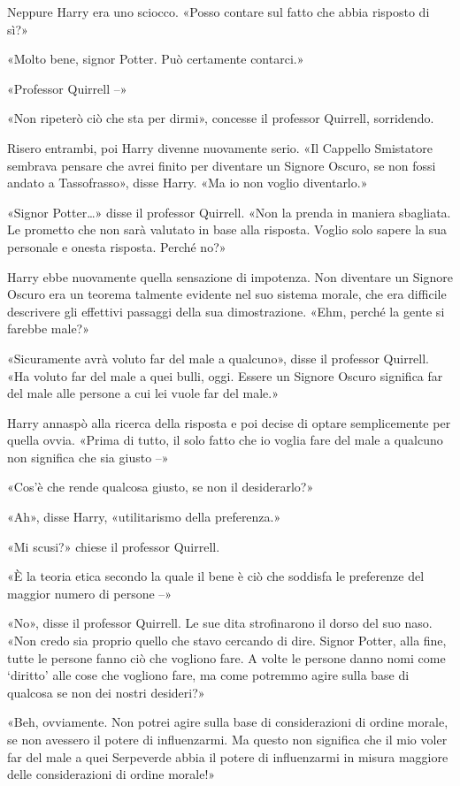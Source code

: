 Neppure Harry era uno sciocco. «Posso contare sul fatto che abbia risposto di sì?»

«Molto bene, signor Potter. Può certamente contarci.»

«Professor Quirrell –»

«Non ripeterò ciò che sta per dirmi», concesse il professor Quirrell, sorridendo.

Risero entrambi, poi Harry divenne nuovamente serio. «Il Cappello Smistatore sembrava pensare che avrei finito per diventare un Signore Oscuro, se non fossi andato a Tassofrasso», disse Harry. «Ma io non voglio diventarlo.»

«Signor Potter…» disse il professor Quirrell. «Non la prenda in maniera sbagliata. Le prometto che non sarà valutato in base alla risposta. Voglio solo sapere la sua personale e onesta risposta. Perché no?»

Harry ebbe nuovamente quella sensazione di impotenza. Non diventare un Signore Oscuro era un teorema talmente evidente nel suo sistema morale, che era difficile descrivere gli effettivi passaggi della sua dimostrazione. «Ehm, perché la gente si farebbe male?»

«Sicuramente avrà voluto far del male a qualcuno», disse il professor Quirrell. «Ha voluto far del male a quei bulli, oggi. Essere un Signore Oscuro significa far del male alle persone a cui lei vuole far del male.»

Harry annaspò alla ricerca della risposta e poi decise di optare semplicemente per quella ovvia. «Prima di tutto, il solo fatto che io voglia fare del male a qualcuno non significa che sia giusto –»

«Cos’è che rende qualcosa giusto, se non il desiderarlo?»

«Ah», disse Harry, «utilitarismo della preferenza.»

«Mi scusi?» chiese il professor Quirrell.

«È la teoria etica secondo la quale il bene è ciò che soddisfa le preferenze del maggior numero di persone –»

«No», disse il professor Quirrell. Le sue dita strofinarono il dorso del suo naso. «Non credo sia proprio quello che stavo cercando di dire. Signor Potter, alla fine, tutte le persone fanno ciò che vogliono fare. A volte le persone danno nomi come ‘diritto’ alle cose che vogliono fare, ma come potremmo agire sulla base di qualcosa se non dei nostri desideri?»

«Beh, ovviamente. Non potrei agire sulla base di considerazioni di ordine morale, se non avessero il potere di influenzarmi. Ma questo non significa che il mio voler far del male a quei Serpeverde abbia il potere di influenzarmi in misura maggiore delle considerazioni di ordine morale!»

